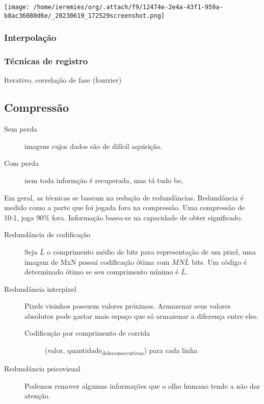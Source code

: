 \documentclass[twocolumn, 9pt]{article}
\begin{document}
\begin{center}
\texttt{[image: /home/ieremies/org/.attach/f9/12474e-2e4a-43f1-959a-b8ac36080d6e/\_20230619\_172529screenshot.png]}
\end{center}
\subsubsection*{Interpolação}
\label{sec:orgbb99fc4}
\subsubsection*{Técnicas de registro}
\label{sec:orgfae01bb}
Iterativo, correlação de fase (fourrier)

\subsection*{Compressão}
\label{sec:orge460ab4}
\begin{description}
\item[{Sem perda}] imagens cujos dados são de difícil aquisição.
\item[{Com perda}] nem toda informção é recuperada, mas tá tudo be,
\end{description}

Em geral, as técnicas se baseam na redução de redundâncias.
Redundância é medido como a parte que foi jogada fora na compressão.
Uma compressão de 10:1, joga 90\% fora.
Informação basea-se na capacidade de obter significado.
\begin{description}
\item[{Redundância de codificação}] Seja \(\bar{L}\) o comprimento médio de bits para representação de um pixel, uma imagem de MxN possui codificação ótima com \(MN\bar{L}\) bits.
Um código é determinado ótimo se seu comprimento mínimo é \(\bar{L}\).
\item[{Redundância interpixel}] Pixels visinhos possuem valores próximos.
Armazenar seus valores absolutos pode gastar mais espaço que só armazenar a diferença entre eles.
\begin{description}
\item[{Codificação por comprimento de corrida}] (valor, quantidade\textsubscript{dele}\textsubscript{consecutivas}) para cada linha
\end{description}
\item[{Redundância psicovisual}] Podemos remover algumas informações que o olho humano tende a não dar atenção.
\end{description}
\end{document}
